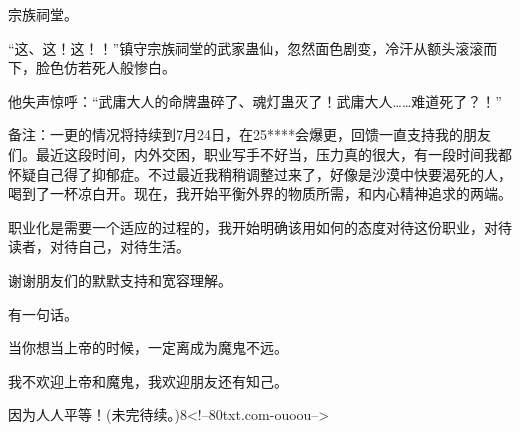 \begin{this_body}
宗族祠堂。

“这、这！这！！”镇守宗族祠堂的武家蛊仙，忽然面色剧变，冷汗从额头滚滚而下，脸色仿若死人般惨白。

他失声惊呼：“武庸大人的命牌蛊碎了、魂灯蛊灭了！武庸大人……难道死了？！”

备注：一更的情况将持续到7月24日，在25****会爆更，回馈一直支持我的朋友们。最近这段时间，内外交困，职业写手不好当，压力真的很大，有一段时间我都怀疑自己得了抑郁症。不过最近我稍稍调整过来了，好像是沙漠中快要渴死的人，喝到了一杯凉白开。现在，我开始平衡外界的物质所需，和内心精神追求的两端。

职业化是需要一个适应的过程的，我开始明确该用如何的态度对待这份职业，对待读者，对待自己，对待生活。

谢谢朋友们的默默支持和宽容理解。

有一句话。

当你想当上帝的时候，一定离成为魔鬼不远。

我不欢迎上帝和魔鬼，我欢迎朋友还有知己。

因为人人平等！(未完待续。)8<!--80txt.com-ouoou-->

\end{this_body}

